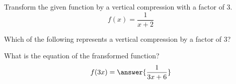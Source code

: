\documentclass{ximera}
\author{Ivo Terek}
\begin{document}
Transform the given function by a vertical compression with a factor of $3$.
\[
f(x)=\frac{1}{x+2}
\]
\begin{exercise}
Which of the following represents a vertical compression by a factor of $3$?
\begin{multipleChoice}
\end{multipleChoice}
\end{exercise}
\begin{exercise}
What is the equation of the fransformed function?
\[
f(3x)=\answer{\frac{1}{3x+6}}
\]
\end{exercise}
\end{document}
